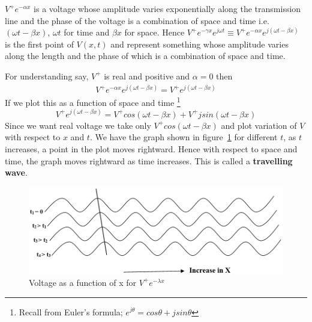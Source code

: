 $ V^{+}e^{-\alpha x} $ is a voltage whose amplitude varies exponentially along the transmission line and the phase of the voltage is a combination of space and time i.e. $  (\omega t- \beta x) $, $ \omega t $ for time and $ \beta x  $ for space. Hence $ V^{+}e^{-\gamma x}e^{j\omega t} \equiv V^{+}e^{-\alpha x}e^{j( \omega t-\beta x)} $ is the first point of $V(x,t)$ and represent something whose amplitude varies along the length and the phase of which is a combination of space and time.

For understanding say, $  V^{+} $ is real and positive and $ \alpha= 0 $ then
\begin{align*}
V^{+}e^{-\alpha x}e^{j( \omega t-\beta x)} = V^{+} e^{j( \omega t-\beta x)}
\end{align*}
If we plot this as a function of space and time
\footnote{Recall from Euler's formula; $ e^{j\theta} = cos\theta + jsin\theta $}
\begin{equation*}
V^{+}e^{j( \omega t-\beta x)} = V^{+}cos(\omega t- \beta x) +  V^{+}jsin(\omega t- \beta x)
\end{equation*}
Since we want real voltage we take only $ V^{+}cos(\omega t- \beta x) $ and plot variation of $ V $ with respect to $ x $ and $ t $. We have the graph shown in figure~\ref{fig:abc} for different $ t $, as $ t $ increases, a point in the plot moves rightward. Hence with respect to space and time, the graph moves rightward as time increases. This is called a \textbf{travelling wave}.
\begin{figure}[h]
\centering
\includegraphics[width=1\linewidth]{./graphics/ABC}
\caption{Voltage as a function of x for $V^+e^{-\lambda x}$}
\label{fig:abc}
\end{figure}

